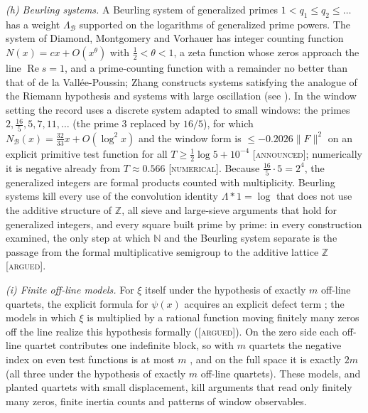 \documentclass[11pt]{amsart}
\theoremstyle{definition}
\theoremstyle{remark}
\numberwithin{equation}{section}
\newcommand{\N}{\mathbb{N}}
\newcommand{\Z}{\mathbb{Z}}
\DeclareMathOperator{\Rel}{Re}
\newcommand{\stag}[1]{\textsc{[#1]}}
\newcommand{\ARGUED}{\stag{argued}}
\newcommand{\NUM}{\stag{numerical}}
\newcommand{\ANNOUNCED}{\stag{announced}}
\newcommand{\entry}[1]{\par\smallskip\noindent\textit{#1.}\enspace}
\begin{document}
\entry{(h) Beurling systems} A Beurling system of generalized primes $1<q_1\le q_2\le\dots$ has a weight
$\Lambda_{\mathcal B}$ supported on the logarithms of generalized prime powers. The system of Diamond,
Montgomery and Vorhauer \cite{DMV2006} has integer counting function $N(x)=cx+O(x^\theta)$ with $\frac12<\theta<1$, a zeta function whose zeros approach the line $\Rel s=1$, and a prime-counting function with a remainder no better than that of de la Vall\'ee-Poussin; Zhang \cite{Zhang2007} constructs systems satisfying the analogue of the Riemann hypothesis and systems with large oscillation (see \cite{DiamondZhang2016,BDR2023}). In the window setting the record uses a discrete system adapted to small
windows: the primes $2,\frac{16}{5},5,7,11,\dots$ (the prime $3$ replaced by $16/5$), for which
$N_{\mathcal B}(x)=\frac{32}{33}x+O(\log^2x)$ and the window form is $\le-0.2026\|F\|^2$ on an explicit primitive
test function for all $T\ge\frac12\log5+10^{-4}$ \ANNOUNCED; numerically it is negative already from
$T\approx0.566$ \NUM. Because $\frac{16}{5}\cdot5=2^4$, the generalized integers are formal products counted
with multiplicity. Beurling systems kill every use of the convolution identity $\Lambda\ast1=\log$ that does not
use the additive structure of $\Z$, all sieve and large-sieve arguments that hold for generalized integers,
and every square built prime by prime: in every construction examined, the only step at which $\N$ and the
Beurling system separate is the passage from the formal multiplicative semigroup to the additive lattice $\Z$
\ARGUED.

\entry{(i) Finite off-line models} For $\xi$ itself under the hypothesis of exactly $m$ off-line quartets,
the explicit formula for $\psi(x)$ acquires an explicit defect term \cite[Theorem~3.3]{P19}; the models in
which $\xi$ is multiplied by a rational function moving finitely many zeros off the line realize this
hypothesis formally (\ARGUED). On the zero side each off-line quartet contributes one indefinite block, so with $m$
quartets the negative index on even test functions is at most $m$ \cite[Corollary~6.5]{P18}, and on the full
space it is exactly $2m$ \cite[Proposition~4.7]{P25} (all three under the hypothesis of exactly $m$ off-line
quartets). These models, and planted quartets with small displacement, kill arguments that read only finitely
many zeros, finite inertia counts and patterns of window observables.
\end{document}
